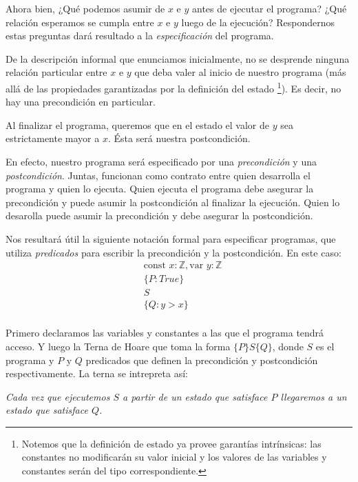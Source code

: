 \documentclass[12pt, a4paper, openany, fleqn]{book}
\newcommand{\declConst}[2]{\text{const } #1 : #2}
\newcommand{\declVar}[2]{\text{var } #1 : #2}
\begin{document}
    Ahora bien, ¿Qué podemos asumir de $x$ e $y$ antes de ejecutar el programa? ¿Qué relación esperamos se cumpla entre $x$ e $y$ luego de la ejecución? Respondernos estas preguntas dará resultado a la \textit{especificación} del programa.

    De la descripción informal que enunciamos inicialmente, no se desprende ninguna relación particular entre $x$ e $y$ que deba valer al inicio de nuestro programa (más allá de las propiedades garantizadas por la definición del estado \footnote{Notemos que la definición de estado ya provee garantías intrínsicas: las constantes no modificarán su valor inicial y los valores de las variables y constantes serán del tipo correspondiente.}). Es decir, no hay una precondición en particular.

    Al finalizar el programa, queremos que en el estado el valor de $y$ sea estrictamente mayor a $x$. Ésta será nuestra postcondición.

    En efecto, nuestro programa será especificado por una \textit{precondición} y una \textit{postcondición}. Juntas, funcionan como contrato entre quien desarrolla el programa y quien lo ejecuta. Quien ejecuta el programa debe asegurar la precondición y puede asumir la postcondición al finalizar la ejecución. Quien lo desarolla puede asumir la precondición y debe asegurar la postcondición.

    Nos resultará útil la siguiente notación formal para especificar programas, que utiliza \textit{predicados} para escribir la precondición y la postcondición. En este caso:
    \begin{align*}
        & \declConst{x}{\mathbb{Z}}, \declVar{y}{\mathbb{Z}}\\
        & \{P: True\} \\
        & S \\
        & \{Q: y > x\}\\
    \end{align*}

    Primero declaramos las variables y constantes a las que el programa tendrá acceso. Y luego la Terna de Hoare que toma la forma $\{P\}S\{Q\}$, donde $S$ es el programa y $P$ y $Q$ predicados que definen la precondición y postcondición respectivamente. La terna se intrepreta así: 
    \begin{center}
        \textit{Cada vez que ejecutemos $S$ a partir de un estado que satisface $P$ llegaremos a un estado que satisface $Q$.}
    \end{center}
    
\end{document}
